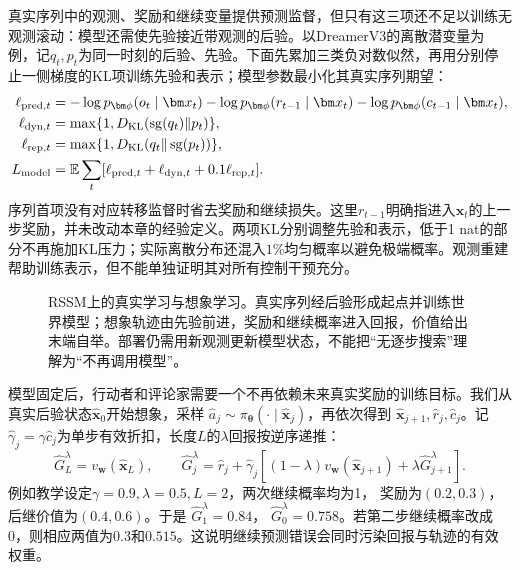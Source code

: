 真实序列中的观测、奖励和继续变量提供预测监督，但只有这三项还不足以训练无观测滚动：模型还需使先验接近带观测的后验。以DreamerV3的离散潜变量为例，记$q_t,p_t$为同一时刻的后验、先验。下面先累加三类负对数似然，再用分别停止一侧梯度的KL项训练先验和表示；模型参数最小化其真实序列期望：
\begin{align}
 \ell_{\mathrm{pred},t}
   &=-\log p_{\bm\phi}(o_t\mid\bm x_t)
     -\log p_{\bm\phi}(r_{t-1}\mid\bm x_t)
     -\log p_{\bm\phi}(c_{t-1}\mid\bm x_t),\notag\\
 \ell_{\mathrm{dyn},t}
   &=\max\{1,D_{\mathrm{KL}}(\operatorname{sg}(q_t)\|p_t)\},\notag\\
 \ell_{\mathrm{rep},t}
   &=\max\{1,D_{\mathrm{KL}}(q_t\|\operatorname{sg}(p_t))\},\notag\\
 L_{\mathrm{model}}&=\mathbb E\sum_t
       [\ell_{\mathrm{pred},t}+\ell_{\mathrm{dyn},t}
                         +0.1\ell_{\mathrm{rep},t}].
 \label{eq:rl-learning-dreamer-model}
\end{align}
序列首项没有对应转移监督时省去奖励和继续损失。这里$r_{t-1}$明确指进入$\bm x_t$的上一步奖励，并未改动本章的经验定义。两项KL分别调整先验和表示，低于1 nat的部分不再施加KL压力；实际离散分布还混入$1\%$均匀概率以避免极端概率。观测重建帮助训练表示，但不能单独证明其对所有控制干预充分。

\begin{figure}[t]
  \centering
  
  \caption{RSSM上的真实学习与想象学习。真实序列经后验形成起点并训练世界模型；想象轨迹由先验前进，奖励和继续概率进入回报，价值给出末端自举。部署仍需用新观测更新模型状态，不能把“无逐步搜索”理解为“不再调用模型”。}
  \label{fig:rl-learning-dreamer}
\end{figure}

模型固定后，行动者和评论家需要一个不再依赖未来真实奖励的训练目标。我们从真实后验状态$\widehat{\bm x}_0$开始想象，采样
$\widehat a_j\sim\pi_{\bm\theta}(\cdot\mid\widehat{\bm x}_j)$，再依次得到
$\widehat{\bm x}_{j+1},\widehat r_j,\widehat c_j$。记
$\widehat\gamma_j=\gamma\widehat c_j$为单步有效折扣，长度$L$的$\lambda$回报按逆序递推：
\begin{equation}
 \widehat G_L^\lambda=v_{\bm w}(\widehat{\bm x}_L),\qquad
 \widehat G_j^\lambda
  =\widehat r_j+\widehat\gamma_j
     [(1-\lambda)v_{\bm w}(\widehat{\bm x}_{j+1})
                              +\lambda\widehat G_{j+1}^\lambda].
 \label{eq:rl-learning-dreamer-return}
\end{equation}
例如教学设定$\gamma=0.9,\lambda=0.5,L=2$，两次继续概率均为1，
奖励为$(0.2,0.3)$，后继价值为$(0.4,0.6)$。于是
$\widehat G_1^\lambda=0.84$，
$\widehat G_0^\lambda=0.758$。若第二步继续概率改成0，则相应两值为$0.3$和$0.515$。这说明继续预测错误会同时污染回报与轨迹的有效权重。

